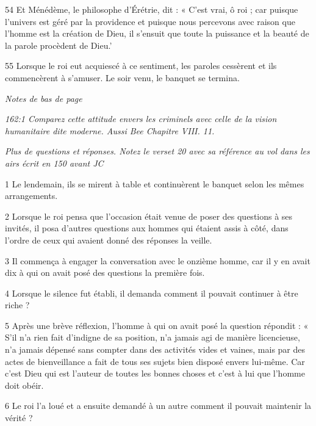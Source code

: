 \par 54 Et Ménédème, le philosophe d'Érétrie, dit : « C'est vrai, ô roi ; car puisque l'univers est géré par la providence et puisque nous percevons avec raison que l'homme est la création de Dieu, il s'ensuit que toute la puissance et la beauté de la parole procèdent de Dieu.'

\par 55 Lorsque le roi eut acquiescé à ce sentiment, les paroles cessèrent et ils commencèrent à s'amuser. Le soir venu, le banquet se termina.

\par \textit{Notes de bas de page}

\par \textit{162:1 Comparez cette attitude envers les criminels avec celle de la vision humanitaire dite moderne. Aussi Bee Chapitre VIII. 11.}


\par \textit{Plus de questions et réponses. Notez le verset 20 avec sa référence au vol dans les airs écrit en 150 avant JC}

\par 1 Le lendemain, ils se mirent à table et continuèrent le banquet selon les mêmes arrangements.

\par 2 Lorsque le roi pensa que l'occasion était venue de poser des questions à ses invités, il posa d'autres questions aux hommes qui étaient assis à côté, dans l'ordre de ceux qui avaient donné des réponses la veille.

\par 3 Il commença à engager la conversation avec le onzième homme, car il y en avait dix à qui on avait posé des questions la première fois.

\par 4 Lorsque le silence fut établi, il demanda comment il pouvait continuer à être riche ?

\par 5 Après une brève réflexion, l'homme à qui on avait posé la question répondit : « S'il n'a rien fait d'indigne de sa position, n'a jamais agi de manière licencieuse, n'a jamais dépensé sans compter dans des activités vides et vaines, mais par des actes de bienveillance a fait de tous ses sujets bien disposé envers lui-même. Car c'est Dieu qui est l'auteur de toutes les bonnes choses et c'est à lui que l'homme doit obéir.

\par 6 Le roi l'a loué et a ensuite demandé à un autre comment il pouvait maintenir la vérité ?

